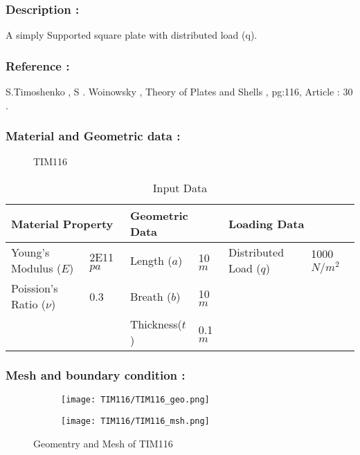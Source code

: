 \documentclass[VM.tex]{subfiles}
\begin{document}
\subsubsection*{Description : }
A simply Supported square plate with distributed load (q). 
\subsubsection*{Reference : }
S.Timoshenko , S . Woinowsky , Theory of Plates and Shells , pg:116, Article : 30 . \\

\subsubsection*{Material and Geometric data : }


\begin{figure}[h!]
\centering

\caption{TIM116} \label{TIM116sch}
\end{figure}
\begin{table}[h!]
\renewcommand{\arraystretch}{1.5}
\centering
\caption{Input Data}
\label{my-labelsdqf}
\begin{tabular}{|ll|ll|ll|}
\hline
\multicolumn{2}{|l|}{\cellcolor[HTML]{C0C0C0}Material Property} & \multicolumn{2}{l|}{\cellcolor[HTML]{C0C0C0}Geometric Data} & \multicolumn{2}{l|}{\cellcolor[HTML]{C0C0C0}Loading Data} \\ \hline  \hline
Young's Modulus ($E$)          & 2E11 $pa$         & Length ($a$)        & 10 $m$        &      Distributed Load ($q$)  & 1000 $N/m^2$     \\
Poission's Ratio ($\nu$)       & 0.3         & Breath ($b$)        & 10 $m$          &        &      \\ 
    &         & Thickness($t$)        & 0.1 $m$          &    &        \\ \hline
\end{tabular}
\end{table}




\subsubsection*{Mesh and boundary condition : }



\begin{figure}[h!]
\begin{subfigure}{.45\textwidth}
\texttt{[image: TIM116/TIM116\_geo.png]}
\end{subfigure} \hfill
\begin{subfigure}{.45\textwidth}
\texttt{[image: TIM116/TIM116\_msh.png]}
\end{subfigure}
\caption{Geomentry and Mesh of TIM116}
\end{figure}
\end{document}
